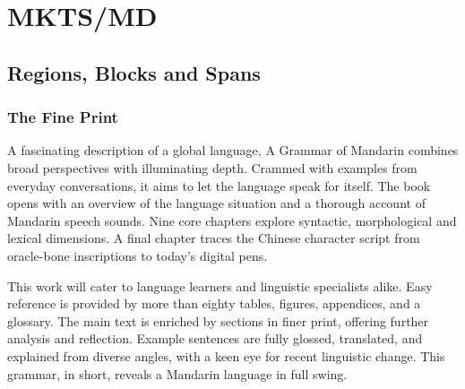 
\begin{multicols}{2}



\mktsShowpar\par
\end{multicols}
\chapter{MKTS/MD
}
\begin{multicols}{2}\end{multicols}
\section{Regions, Blocks and Spans
}
\begin{multicols}{2}
\subsection{The Fine Print
}
A fascinating description of a global language, {\mktsStyleItalic{}A Grammar of Mandarin\/} combines broad perspectives with illuminating depth. Crammed with examples from everyday conversations, it aims to let the language speak for itself. The book opens with an overview of the language situation and a thorough account of Mandarin speech sounds. Nine core chapters explore syntactic, morphological and lexical dimensions. A final chapter traces the Chinese character script from oracle-bone inscriptions to today’s digital pens.\mktsShowpar\par
This work will cater to language learners and linguistic specialists alike. Easy reference is provided by more than eighty tables, figures, appendices, and a glossary. The main text is enriched by sections in finer print, offering further analysis and reflection. Example sentences are fully glossed, translated, and explained from diverse angles, with a keen eye for recent linguistic change. This grammar, in short, reveals a Mandarin language in full swing.\mktsShowpar\par
\end{multicols}
